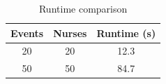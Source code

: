 \begin{table}[h]
\centering
\begin{tabular}{ccc}
\toprule
Events & Nurses & Runtime (s) \\
\midrule
20 & 20 & 12.3 \\
50 & 50 & 84.7 \\
\bottomrule
\end{tabular}
\caption{Runtime comparison}
\end{table}